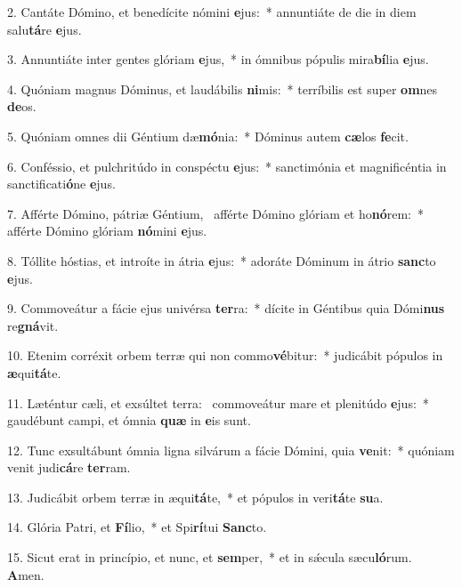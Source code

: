 2. Cantáte Dómino, et benedícite nómini \textbf{e}jus:~*  annuntiáte de die in diem salu\textbf{tá}re \textbf{e}jus.\

3. Annuntiáte inter gentes glóriam \textbf{e}jus,~*  in ómnibus pópulis mira\textbf{bí}lia \textbf{e}jus.\

4. Quóniam magnus Dóminus, et laudábilis \textbf{ni}mis:~*  terríbilis est super \textbf{om}nes \textbf{de}os.\

5. Quóniam omnes dii Géntium dæ\textbf{mó}nia:~*  Dóminus autem \textbf{cæ}los \textbf{fe}cit.\

6. Conféssio, et pulchritúdo in conspéctu \textbf{e}jus:~*  sanctimónia et magnificéntia in sanctificati\textbf{ó}ne \textbf{e}jus.\

7. Afférte Dómino, pátriæ Géntium, \dag\  afférte Dómino glóriam et ho\textbf{nó}rem:~*  afférte Dómino glóriam \textbf{nó}mini \textbf{e}jus.\

8. Tóllite hóstias, et introíte in átria \textbf{e}jus:~*  adoráte Dóminum in átrio \textbf{sanc}to \textbf{e}jus.\

9. Commoveátur a fácie ejus univérsa \textbf{ter}ra:~*  dícite in Géntibus quia Dómi\textbf{nus} re\textbf{gná}vit.\

10. Etenim corréxit orbem terræ qui non commo\textbf{vé}bitur:~*  judicábit pópulos in \textbf{æ}qui\textbf{tá}te.\

11. Læténtur cæli, et exsúltet terra: \dag\  commoveátur mare et plenitúdo \textbf{e}jus:~*  gaudébunt campi, et ómnia \textbf{quæ} in \textbf{e}is sunt.\

12. Tunc exsultábunt ómnia ligna silvárum a fácie Dómini, quia \textbf{ve}nit:~*  quóniam venit judi\textbf{cá}re \textbf{ter}ram.\

13. Judicábit orbem terræ in æqui\textbf{tá}te,~*  et pópulos in veri\textbf{tá}te \textbf{su}a.\

14. Glória Patri, et \textbf{Fí}lio,~*  et Spi\textbf{rí}tui \textbf{Sanc}to.\

15. Sicut erat in princípio, et nunc, et \textbf{sem}per,~*  et in sǽcula sæcu\textbf{ló}rum. \textbf{A}men.\

